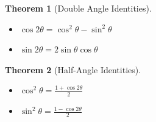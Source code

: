 \documentclass[12pt, letterpaper]{article}
\theoremstyle{break}
\newtheorem{theorem}{Theorem}
\begin{document}
%
\begin{theorem}[Double Angle Identities]
    \begin{itemize}
        \item $\cos2\theta = \cos^2\theta - \sin^2\theta$
        \item $\sin2\theta = 2\sin\theta\cos\theta$
    \end{itemize}
\end{theorem}
%
\begin{theorem}[Half-Angle Identities]
    \begin{itemize}
        \item $\cos^2\theta = \frac{1 + \cos2\theta}{2}$
        \item $\sin^2\theta = \frac{1 - \cos2\theta}{2}$
    \end{itemize}
\end{theorem}
\end{document}
